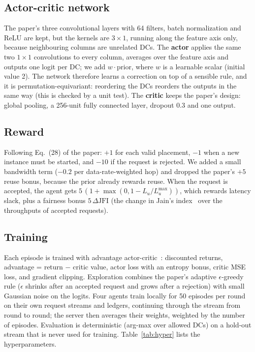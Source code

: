 \documentclass[11pt,a4paper]{article}
\begin{document}
\subsection{Actor-critic network}
The paper's three convolutional layers with 64 filters, batch normalization and
ReLU are kept, but the kernels are $3\times1$, running along the feature axis
only, because neighbouring columns are unrelated DCs. The \textbf{actor} applies
the same two $1\times1$ convolutions to every column, averages over the feature
axis and outputs one logit per DC; we add $w\cdot\text{prior}$, where $w$ is a
learnable scalar (initial value 2). The network therefore learns a correction on
top of a sensible rule, and it is permutation-equivariant: reordering the DCs
reorders the outputs in the same way (this is checked by a unit test). The
\textbf{critic} keeps the paper's design: global pooling, a 256-unit fully
connected layer, dropout 0.3 and one output.

\subsection{Reward}\label{sec:reward}
Following Eq.~(28) of the paper: $+1$ for each valid placement, $-1$ when a new
instance must be started, and $-10$ if the request is rejected. We added a small
bandwidth term ($-0.2$ per data-rate-weighted hop) and dropped the paper's $+5$
reuse bonus, because the prior already rewards reuse. When the request is
accepted, the agent gets $5\,(1 + \max(0,1 - L_u/L^{\max}_u))$, which rewards
latency slack, plus a fairness bonus $5\,\Delta\mathrm{JFI}$ (the change in
Jain's index~\cite{jain} over the throughputs of accepted requests).

\subsection{Training}
Each episode is trained with advantage actor-critic~\cite{a3c}: discounted
returns, advantage = return $-$ critic value, actor loss with an entropy bonus,
critic MSE loss, and gradient clipping. Exploration combines the paper's
adaptive $\epsilon$-greedy rule ($\epsilon$ shrinks after an accepted request
and grows after a rejection) with small Gaussian noise on the logits. Four
agents train locally for 50 episodes per round on their own request streams and
ledgers, continuing through the stream from round to round; the server then
averages their weights, weighted by the number of episodes. Evaluation is
deterministic (arg-max over allowed DCs) on a hold-out stream that is never used
for training. Table~\ref{tab:hyper} lists the hyperparameters.
\end{document}
